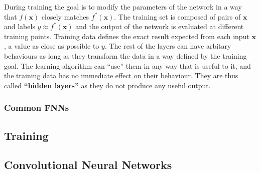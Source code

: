 During training the goal is to modify the parameters of the
network in a way that $f(\bm{x})$ closely matches $f^*(\bm{x})$. The training
set is composed of pairs of $\bm{x}$ and labels $y \approx f^*(\bm{x})$ and
the output of the network is evaluated at different training points. Training
data defines the exact result expected from each input $\bm{x}$, a value as close
as possible to $y$. The rest of the layers can have arbitary behaviours as long
as they transform the data in a way defined by the training goal. The
learning algorithm can ``use'' them in any way that is useful to it, and
the training data has no immediate effect on their behaviour. They are
thus called \textbf{``hidden layers''} as they do not produce any
useful output. 

\subsubsection*{Common FNNs}


\subsection{Training}



\newpage
\subsection{Convolutional Neural Networks}
\newpage

